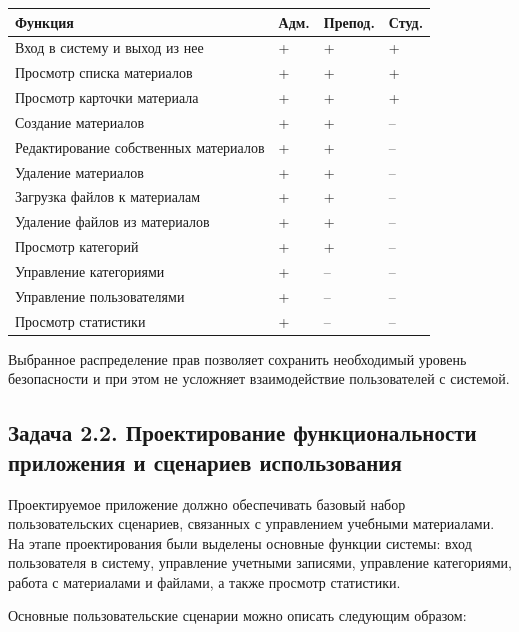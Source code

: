 \documentclass[14pt,a4paper]{extarticle}
\begin{document}
\begin{center}
\small\begin{tabularx}{0.96\textwidth}{>{\raggedright\arraybackslash}p{7.8cm} >{\centering\arraybackslash}p{1.6cm} >{\centering\arraybackslash}p{2.1cm} >{\centering\arraybackslash}p{2.0cm}}
\toprule
\textbf{Функция} & \textbf{Адм.} & \textbf{Препод.} & \textbf{Студ.} \\
\midrule
Вход в систему и выход из нее & + & + & + \\
Просмотр списка материалов & + & + & + \\
Просмотр карточки материала & + & + & + \\
Создание материалов & + & + & -- \\
Редактирование собственных материалов & + & + & -- \\
Удаление материалов & + & + & -- \\
Загрузка файлов к материалам & + & + & -- \\
Удаление файлов из материалов & + & + & -- \\
Просмотр категорий & + & + & -- \\
Управление категориями & + & -- & -- \\
Управление пользователями & + & -- & -- \\
Просмотр статистики & + & -- & -- \\
\bottomrule
\end{tabularx}
\end{center}

Выбранное распределение прав позволяет сохранить необходимый уровень безопасности и при этом не усложняет взаимодействие пользователей с системой.

\subsection{Задача 2.2. Проектирование функциональности приложения и сценариев использования}

Проектируемое приложение должно обеспечивать базовый набор пользовательских сценариев, связанных с управлением учебными материалами. На этапе проектирования были выделены основные функции системы: вход пользователя в систему, управление учетными записями, управление категориями, работа с материалами и файлами, а также просмотр статистики.

Основные пользовательские сценарии можно описать следующим образом:
\end{document}

